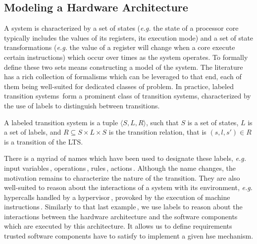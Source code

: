 \subsection{Modeling a Hardware Architecture}
\label{subsec:sota:ltsdef}

 A system is characterized by a set of states (\emph{e.g.} the state of
a processor core typically includes the values of its registers, its execution
mode) and a set of state transformations (\emph{e.g.}  the value of a register
will change when a core execute certain instructions) which occur over times as
the system operates.
%
To formally define these two sets means constructing a model of the system.
%
The literature has a rich collection of formalisms which can be leveraged to
that end, each of them being well-suited for dedicated classes of problem.
%
In practice, labeled transition systems\,\cite{loiseaux1995lts} form a prominent
class of transition systems, characterized by the use of labels to distinguish
between transitions.

\begin{definition}
  A labeled transition system is a tuple \( \langle S, L, R \rangle \), such
  that \( S \) is a set of states, \( L \) is a set of labels, and
  \( R \subseteq S \times L \times S \) is the transition relation, that is
  \( (s, l, s') \in R \) is a transition of the LTS.
\end{definition}

There is a myriad of names which have been used to designate these labels,
\emph{e.g.} input variables\,\cite{cimatti2002nusmv},
operations\,\cite{jackson2012alloy}, rules\,\cite{murphi},
actions\,\cite{barthe2011virtcert1}.
%
Although the name changes, the motivation remains to characterize the nature of
the transition.
%
They are also well-suited to reason about the interactions of a system with its
environment, \emph{e.g.} hypercalls handled by a
hypervisor\,\cite{barthe2011virtcert1}, \IOs provoked by the execution of
machine instructions\,\cite{lie2003xom}.
%
Similarly to that last example\,\cite{lie2003xom}, we use labels to reason about
the interactions between the hardware architecture and the software components
which are executed by this architecture.
%
It allows us to define requirements trusted software components have to satisfy
to implement a given \ac{hse} mechanism.

